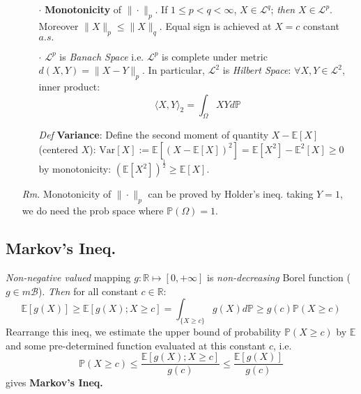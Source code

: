 \documentclass[a4paper,12pt,twoside]{book}
\begin{document}
\begin{itemize}
\begin{itemize}
			\item[$\cdot$] \textbf{Monotonicity} of $\|\cdot\|_p$. If $1\leq p<q<\infty$, $X\in \mathcal{L}^q$; \textit{then} $X\in \mathcal{L}^p$. Moreover $\|X\|_p\leq \|X\|_q$. Equal sign is achieved at $X=c$ constant $a.s.$

			\item[$\cdot$] $\mathcal{L}^p$ is \textit{Banach Space} i.e. $\mathcal{L}^p$ is complete under metric $d(X,Y)=\|X-Y\|_p$.\newline
			In particular, $\mathcal{L}^2$ is \textit{Hilbert Space}: $\forall X,Y \in \mathcal{L}^2$, inner product:
			\begin{equation}
				\langle X,Y\rangle_2 = \int_{\Omega} XY d \mathbb{P}
			\end{equation}

			\item[\textit{Def}] \textbf{Variance}: Define the second moment of quantity $X- \mathbb{E}[X]$ (centered $X$): $\mathrm{Var}[X]:=\mathbb{E}[(X- \mathbb{E}[X])^2]=\mathbb{E}[X^2]-\mathbb{E}^2[X]\geq 0$ by monotonicity: $(\mathbb{E}[X^2])^{\frac{1}{2}}\geq \mathbb{E}[X]$.
		\end{itemize}
		\item[\textit{Rm.}] Monotonicity of $\|\cdot\|_p$ can be proved by Holder's ineq. taking $Y=1$, we do need the prob space where $\mathbb{P}(\Omega)=1$.
\end{itemize}

\subsection{Markov's Ineq.}
\textit{Non-negative valued} mapping $g: \mathbb{R}\mapsto [0,+\infty]$ is \textit{non-decreasing} Borel function ($g\in m \mathscr{B}$). \textit{Then} for all constant $c\in \mathbb{R}$:
\begin{equation}
	\mathbb{E}[g(X)]\geq \mathbb{E}[g(X);X\geq c]=\int_{\{X\geq c\}}g(X)d \mathbb{P}\geq g(c)\mathbb{P}(X\geq c)
\end{equation}
Rearrange this ineq, we estimate the upper bound of probability $\mathbb{P}(X\geq c)$ by $\mathbb{E}$ and some pre-determined function evaluated at this constant $c$, i.e.
\begin{equation}
	\mathbb{P}(X\geq c)\leq \frac{\mathbb{E}[g(X);X\geq c]}{g(c)}\leq \frac{\mathbb{E}[g(X)]}{g(c)}
\end{equation}
gives \textbf{Markov's Ineq.}
\end{document}
